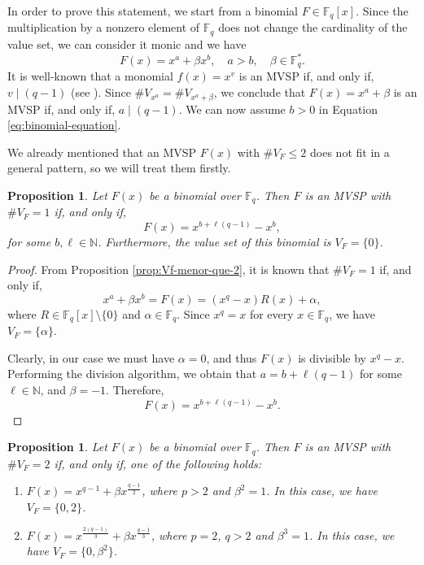 \documentclass[preprint,12pt]{elsarticle}
\newtheorem{proposition}[theorem]{Proposition}
\begin{document}
In order to prove this statement, we start from a binomial $F \in \mathbb{F}_q[x]$. Since the multiplication by a nonzero element of $\mathbb{F}_q$ does not change the cardinality of the value set, we can consider it monic and we have
\begin{equation}\label{eq:binomial-equation}
F(x) = x^a + \beta x^b, \quad a > b, \quad \beta \in \mathbb{F}_q^*.
\end{equation}
It is well-known that a monomial $f(x) = x^v$ is an MVSP if, and only if, $v \mid (q - 1)$ (see \cite[Theorem 8.3.29]{handbook}). Since $\# V_{x^a} = \# V_{x^a + \beta}$, we conclude that $F(x) = x^a + \beta$ is an MVSP if, and only if, $a \mid (q - 1)$. We can now assume $b > 0 $ in Equation \eqref{eq:binomial-equation}.

We already mentioned that an MVSP $F(x)$ with $\# V_F \leq 2$ does not fit in a general pattern, so we will treat them firstly.

\begin{proposition}\label{Vf=1}
    Let $F(x)$ be a binomial over $\mathbb{F}_q$. Then $F$ is an MVSP with $\# V_F = 1$ if, and only if,
    $$F(x) = x^{b + \ell(q - 1)} - x^{b},$$ for some $b, \ell \in \mathbb{N}$. Furthermore, the value set of this binomial is $V_F = \{0\}$.
\end{proposition}
\begin{proof}
      From Proposition \ref{prop:Vf-menor-que-2}, it is known that \( \# V_F = 1 \) if, and only if,
    $$
    x^a + \beta x^b = F(x) = (x^q - x)R(x) + \alpha,
    $$
    where \( R \in \mathbb{F}_q[x] \setminus \{0\} \) and \( \alpha \in \mathbb{F}_q \). Since $x^q = x$ for every $x \in \mathbb{F}_q$, we have $V_F = \{\alpha\}$.

    Clearly, in our case we must have \( \alpha = 0 \), and thus \( F(x) \) is divisible by \( x^q - x \). Performing the division algorithm, we obtain that \( a = b + \ell(q - 1) \) for some \( \ell \in \mathbb{N} \), and \( \beta = -1 \). Therefore,
    $$
    F(x) = x^{b + \ell(q - 1)} - x^b.
    $$
\end{proof}

\begin{proposition}\label{Vf=2}
    Let $F(x)$ be a binomial over $\mathbb{F}_q$. Then $F$ is an MVSP with $\# V_F = 2$ if, and only if, one of the following holds:
    \begin{enumerate}
        \item[$\mathrm{(i)}$] $F(x) = x^{q-1} + \beta x^{\frac{q-1}{2}}$, where $p > 2$ and $\beta^2 =1$. In this case, we have $V_F = \{0, 2\}$.
        \item[$\mathrm{(ii)}$] $F(x) = x^{\frac{2(q-1)}{3}} + \beta x^{\frac{q-1}{3}}$, where $p = 2$, $q > 2$ and $\beta^3 = 1$. In this case, we have $V_F = \{0, \beta^2\}$.
    \end{enumerate}
\end{proposition}
\end{document}
